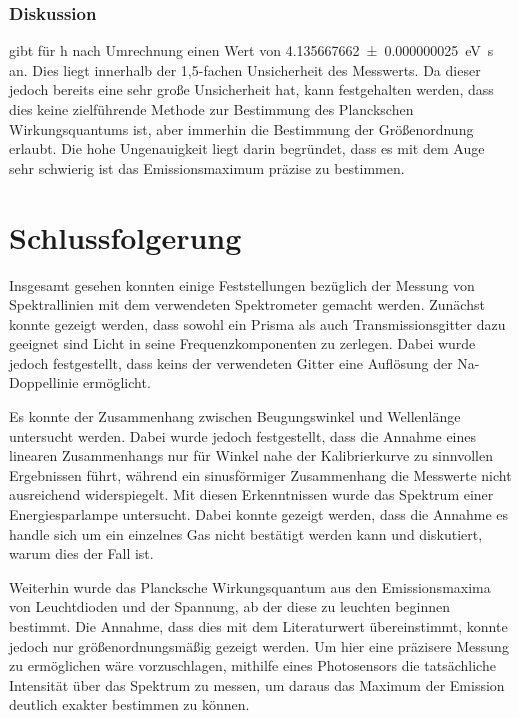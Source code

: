 \documentclass[
	a4paper,
	12pt,
	pagesize,
	ngerman
]{scrartcl}
\begin{document}
	\subsubsection{Diskussion}
	
	\cite{Planck} gibt für h nach Umrechnung einen Wert von \SI{4.135667662 \pm 0.000000025}{\electronvolt \second} an.
	Dies liegt innerhalb der 1,5-fachen Unsicherheit des Messwerts.
	Da dieser jedoch bereits eine sehr große Unsicherheit hat, kann festgehalten werden, dass dies keine zielführende Methode zur Bestimmung des Planckschen Wirkungsquantums ist, aber immerhin die Bestimmung der Größenordnung erlaubt.
	Die hohe Ungenauigkeit liegt darin begründet, dass es mit dem Auge sehr schwierig ist das Emissionsmaximum präzise zu bestimmen.
	
	
	
	\section{Schlussfolgerung}
	Insgesamt gesehen konnten einige Feststellungen bezüglich der Messung von Spektrallinien mit dem verwendeten Spektrometer gemacht werden.
	Zunächst konnte gezeigt werden, dass sowohl ein Prisma als auch Transmissionsgitter dazu geeignet sind Licht in seine Frequenzkomponenten zu zerlegen.
	Dabei wurde jedoch festgestellt, dass keins der verwendeten Gitter eine Auflösung der Na-Doppellinie ermöglicht.
	
	Es konnte der Zusammenhang zwischen Beugungswinkel und Wellenlänge untersucht werden.
	Dabei wurde jedoch festgestellt, dass die Annahme eines linearen Zusammenhangs nur für Winkel nahe der Kalibrierkurve zu sinnvollen Ergebnissen führt, während ein sinusförmiger Zusammenhang die Messwerte nicht ausreichend widerspiegelt.
	Mit diesen Erkenntnissen wurde das Spektrum einer Energiesparlampe untersucht.
	Dabei konnte gezeigt werden, dass die Annahme es handle sich um ein einzelnes Gas nicht bestätigt werden kann und diskutiert, warum dies der Fall ist.
	
	Weiterhin wurde das Plancksche Wirkungsquantum aus den Emissionsmaxima von Leuchtdioden und der Spannung, ab der diese zu leuchten beginnen bestimmt.
	Die Annahme, dass dies mit dem Literaturwert übereinstimmt, konnte jedoch nur größenordnungsmäßig gezeigt werden.
	Um hier eine präzisere Messung zu ermöglichen wäre vorzuschlagen, mithilfe eines Photosensors die tatsächliche Intensität über das Spektrum zu messen, um daraus das Maximum der Emission deutlich exakter bestimmen zu können.
	\printbibliography
\end{document}
